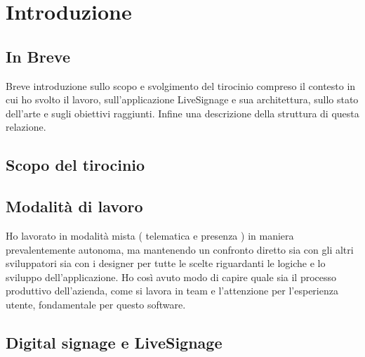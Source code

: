 \chapter{Introduzione}
\linespread{1.5}

\section{In Breve}
Breve introduzione sullo scopo e svolgimento del tirocinio compreso il contesto in cui ho svolto il lavoro, sull'applicazione LiveSignage e sua architettura, sullo stato dell'arte e sugli obiettivi raggiunti. Infine una descrizione della struttura di questa relazione.

\section{Scopo del tirocinio}


\section{Modalità di lavoro}

Ho lavorato in modalità mista ( telematica e presenza ) in maniera prevalentemente autonoma, ma mantenendo un confronto diretto sia con gli altri sviluppatori sia con i designer per tutte le scelte riguardanti le logiche e lo sviluppo dell'applicazione. Ho così avuto modo di capire quale sia il processo produttivo dell'azienda, come si lavora in team e l'attenzione per l'esperienza utente, fondamentale per questo software.

\section{Digital signage e LiveSignage}

